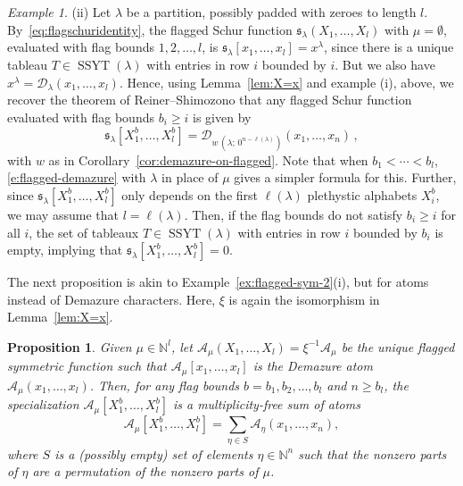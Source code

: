 \documentclass[12pt]{amsart}
\newtheorem{prop}[thm]{Proposition}
\theoremstyle{definition}
\theoremstyle{remark}
\newtheorem{example}[thm]{Example}
\newcommand{\NN}{{\mathbb N}}
\newcommand{\sfrak}{{\mathfrak s}}
\newcommand{\Acal}{{\mathcal A}}
\newcommand{\Dcal}{{\mathcal D}}
\DeclareMathOperator{\SSYT}{SSYT}
\begin{document}
\begin{example}
(ii) Let $\lambda $ be a partition, possibly padded with zeroes to
length $l$.  By~\eqref{eq:flagschuridentity}, the flagged Schur
function $\sfrak _{\lambda }(X_{1},\ldots,X_{l})$ with $\mu =
\emptyset$, evaluated with flag bounds $1,2,\dots, l$, is $\sfrak
_{\lambda }[x_{1},\ldots,x_{l}] = x^{\lambda }$, since there is a
unique tableau $T\in \SSYT (\lambda )$ with entries in row $i$ bounded
by $i$. But we also have $x^{\lambda } = \Dcal _{\lambda
}(x_1,\ldots,x_l)$.  Hence, using Lemma~\ref{lem:X=x} and example (i),
above, we recover the theorem of Reiner--Shimozono \cite[Theorem
23]{RS} that any flagged Schur function evaluated with flag bounds
$b_{i}\geq i$ is given by
\begin{equation}
\sfrak _{\lambda }[X^b_{1},\ldots,X^b_{l}] = \Dcal _{w\, (\lambda ;\,
0^{n-\ell (\lambda )})}(x_1,\ldots, x_n)\,,
\end{equation}
with $w$ as in Corollary~\ref{cor:demazure-on-flagged}.  Note that
when $b_{1}<\cdots <b_{l}$, \eqref{e:flagged-demazure} with $\lambda $
in place of $\mu $ gives a simpler formula for this.  Further, since
$\sfrak _{\lambda }[X^b_{1},\ldots,X^b_{l}]$ only depends on the first
$\ell (\lambda )$ plethystic alphabets $X^b_{i}$, we may assume that $l = \ell
(\lambda )$.  Then, if the flag bounds do not satisfy $b_{i}\geq i$
for all $i$, the set of tableaux $T\in \SSYT (\lambda )$ with entries
in row $i$ bounded by $b_{i}$ is empty, implying that $\sfrak
_{\lambda }[X^b_{1},\ldots,X^b_{l}] = 0$.
\end{example}

The next proposition is akin to Example~\ref{ex:flagged-sym-2}(i), but
for atoms instead of Demazure characters.  Here, $\xi $ is again the
isomorphism in Lemma~\ref{lem:X=x}.

\begin{prop}\label{prop:flagged-atom}
Given $\mu \in \NN ^{l}$, let $\Acal _{\mu }(X_{1},\ldots,X_{l}) = \xi
^{-1}\Acal _{\mu }$ be the unique flagged symmetric function such that
$\Acal _{\mu }[x_{1},\ldots,x_{l}]$ is the Demazure atom $\Acal _{\mu
}(x_{1},\ldots,x_{l})$.  Then, for any flag bounds $b =
b_{1},b_{2},\ldots,b_{l}$ and $n\geq b_{l}$, the specialization $\Acal
_{\mu } [X^b_{1},\ldots,X^b_{l}]$ is a multiplicity-free sum of atoms
\begin{equation}\label{e:flagged-atom}
\Acal _{\mu } [X^b_{1},\ldots,X^b_{l}] = \sum _{\eta \in S}\Acal _{\eta
}(x_{1},\ldots,x_{n}),
\end{equation}
where $S$ is a (possibly empty) set of elements $\eta \in \NN ^{n}$
such that the nonzero parts of $\eta $ are a permutation of the
nonzero parts of $\mu $.
\end{prop}
\end{document}

